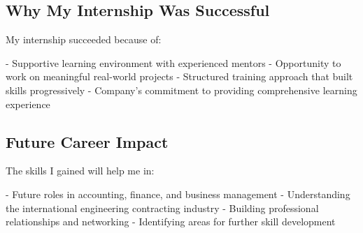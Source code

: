 \subsection{Why My Internship Was Successful}
My internship succeeded because of:

- Supportive learning environment with experienced mentors
- Opportunity to work on meaningful real-world projects
- Structured training approach that built skills progressively
- Company's commitment to providing comprehensive learning experience

\subsection{Future Career Impact}
The skills I gained will help me in:

- Future roles in accounting, finance, and business management
- Understanding the international engineering contracting industry
- Building professional relationships and networking
- Identifying areas for further skill development
